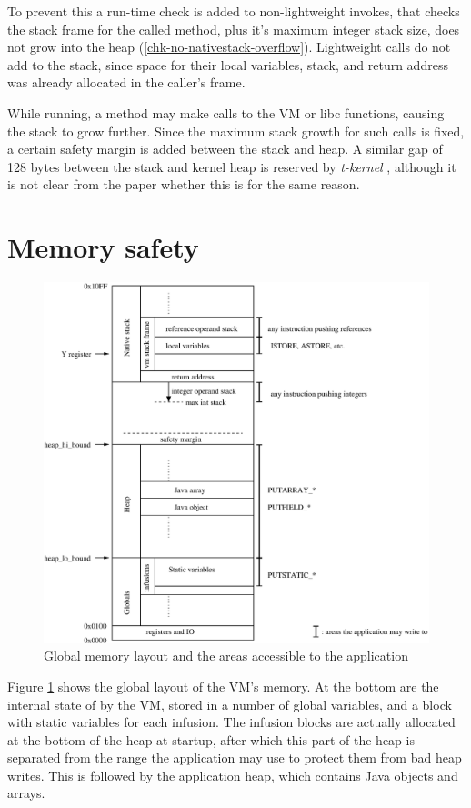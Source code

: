 To prevent this a run-time check is added to non-lightweight invokes, that checks the stack frame for the called method, plus it's maximum integer stack size, does not grow into the heap (\ref{chk-no-nativestack-overflow}). Lightweight calls do not add to the stack, since space for their local variables, stack, and return address was already allocated in the caller's frame.

While running, a method may make calls to the VM or libc functions, causing the stack to grow further. Since the maximum stack growth for such calls is fixed, a certain safety margin is added between the stack and heap. A similar gap of 128 bytes between the stack and kernel heap is reserved by \emph{t-kernel} \cite{Gu:2005un}, although it is not clear from the paper whether this is for the same reason.

\section{Memory safety}

\begin{figure}
\includegraphics[width=\linewidth]{memlayout.eps}
\caption{Global memory layout and the areas accessible to the application}
\label{fig-memlayout}
\end{figure}

Figure \ref{fig-memlayout} shows the global layout of the VM's memory. At the bottom are the internal state of by the VM, stored in a number of global variables, and a block with static variables for each infusion. The infusion blocks are actually allocated at the bottom of the heap at startup, after which this part of the heap is separated from the range the application may use to protect them from bad heap writes. This is followed by the application heap, which contains Java objects and arrays.

